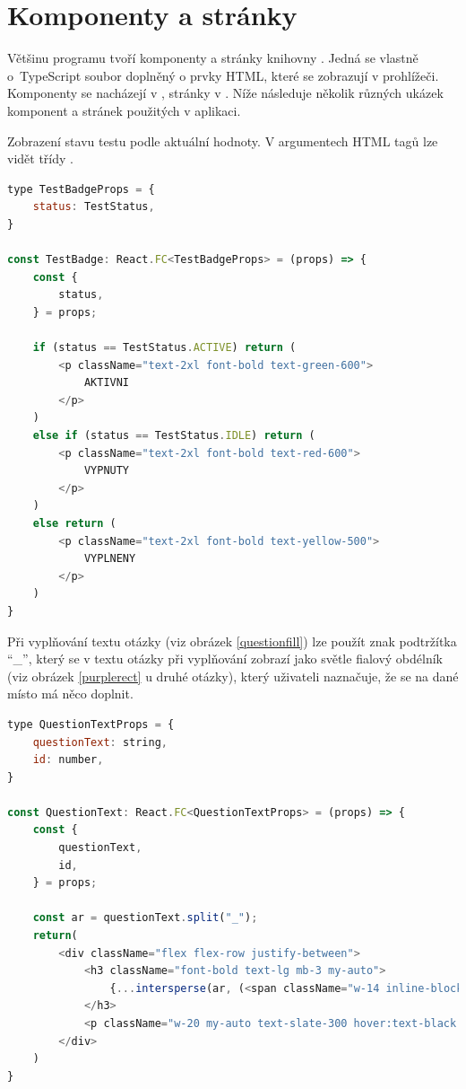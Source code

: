 \pagebreak

\section{Komponenty a stránky}

Většinu programu tvoří komponenty a stránky knihovny . Jedná se vlastně o~TypeScript soubor doplněný o prvky HTML, které se zobrazují v prohlížeči. Komponenty se nacházejí v , stránky v . Níže následuje několik různých ukázek komponent a stránek použitých v aplikaci. 

Zobrazení stavu testu podle aktuální hodnoty. V argumentech  HTML tagů lze vidět třídy .

\begin{lstlisting}[language=JavaScript,caption={Úryvek z \M{/src/pages/admin/tests/index.tsx}; status testu.}]
type TestBadgeProps = {
    status: TestStatus,
}

const TestBadge: React.FC<TestBadgeProps> = (props) => {
    const {
        status,
    } = props;

    if (status == TestStatus.ACTIVE) return (
        <p className="text-2xl font-bold text-green-600">
            AKTIVNI
        </p>
    )
    else if (status == TestStatus.IDLE) return (
        <p className="text-2xl font-bold text-red-600">
            VYPNUTY
        </p>
    )
    else return (
        <p className="text-2xl font-bold text-yellow-500">
            VYPLNENY
        </p>
    )
}
\end{lstlisting}

\newpage
Při vyplňování textu otázky (viz obrázek \ref{questionfill}) lze použít znak podtržítka \enquote{\_}, který se v textu otázky při vyplňování zobrazí jako světle fialový obdélník (viz obrázek \ref{purplerect} u druhé otázky), který uživateli naznačuje, že se na dané místo má něco doplnit. 

\begin{lstlisting}[language=JavaScript,caption={Úryvek z \M{/src/pages/test/index.tsx}; komponent textu otázky, výměna znaku \enquote{\_} za fialový obdélník.}]
type QuestionTextProps = {
    questionText: string,
    id: number,
}

const QuestionText: React.FC<QuestionTextProps> = (props) => {
    const {
        questionText,
        id,
    } = props;

    const ar = questionText.split("_");
    return(
        <div className="flex flex-row justify-between"> 
            <h3 className="font-bold text-lg mb-3 my-auto">
                {...intersperse(ar, (<span className="w-14 inline-block rounded-lg bg-purple-100 border-2 border-purple-200 mx-1 text-transparent">___</span>))}
            </h3>
            <p className="w-20 my-auto text-slate-300 hover:text-black hover:font-semibold mx-2">id: {id}</p>
        </div>
    )
}
\end{lstlisting}

